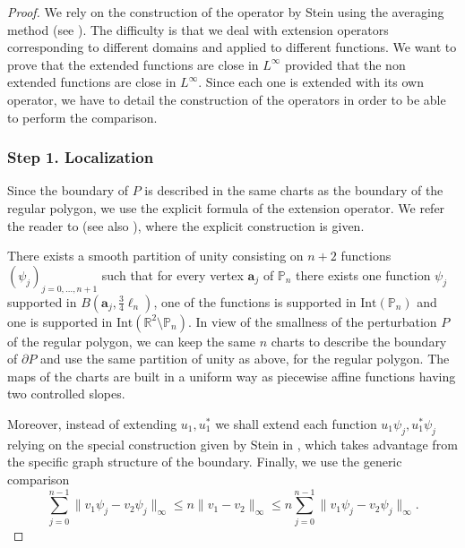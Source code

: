 \documentclass[JEP,XML,SOM,Unicode,ThmDefs,NoFloatCountersInSection,published]{cedram}
\theoremstyle{plain}
\theoremstyle{definition}
\newcommand{\bo}[1]{{\boldsymbol#1}}
\let\Bbb\mathbb
\def\R{\mathbb{R}}
\begin{document}
\begin{proof}

We rely on the construction of the operator by Stein using the averaging method (see \cite[Th.\,5, p.\,181]{St70}). The difficulty is that we deal with extension operators corresponding to different domains and applied to different functions. We want to prove that the extended functions are close in $L^\infty$ provided that the non extended functions are close in $L^\infty$. Since each one is extended with its own operator, we have to detail the construction of the operators in order to be able to perform the comparison.

\subsubsection*{Step 1. Localization}
Since the boundary of $P$ is described in the same charts as the boundary of the regular polygon, we use the explicit formula of the extension operator. We refer the reader to \cite[Th.\,5, p.\,181]{St70} (see also \cite{LaVi19,HLZ12}), where the explicit construction is given.

There exists a smooth partition of unity consisting on $n+2$ functions $(\psi_j)_{j=0, \dots, n+1}$ such that for every vertex $\bo a_j$ of $\Bbb P_n$ there exists one function $\psi_j$ supported in $B(\bo a_j, \frac34 \ell_n)$, one of the functions is supported in $\text{Int}(\Bbb P_n)$ and one is supported in $\text{Int}(\R^2 \setminus \Bbb P_n)$.
In view of the smallness of the perturbation $P$ of the regular polygon, we can keep the same $n$ charts to describe the boundary of $\partial P$ and use the same partition of unity as above, for the regular polygon.
The maps of the charts are built in a uniform way as piecewise affine functions having two controlled slopes.

Moreover, instead of extending $u_1, u_1^*$ we shall extend each function $u_1\psi_j, u_1^*\psi_j$ relying on the special construction given by Stein in \cite[Th.\,5, p.\,181]{St70}, which takes advantage from the specific graph structure of the boundary. Finally, we use the generic comparison
\[
\sum_{j=0}^{n-1} \| v_1\psi_j -v_2\psi_j\|_\infty \le n \| v_1 -v_2 \|_\infty \le n \sum_{j=0}^{n-1} \| v_1\psi_j -v_2\psi_j\|_\infty.
\]


\end{proof}
\end{document}
